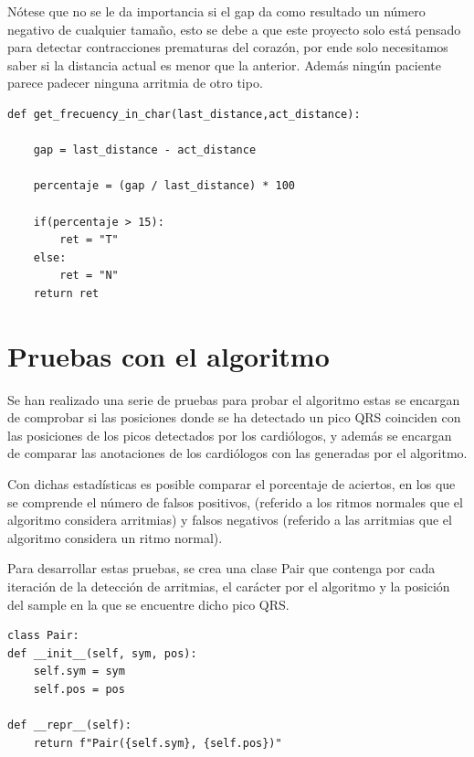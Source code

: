 Nótese que no se le da importancia si el gap da como resultado un número negativo de cualquier tamaño, esto se debe
a que este proyecto solo está pensado para detectar contracciones prematuras del corazón, por ende solo necesitamos 
saber si la distancia actual es menor que la anterior. Además ningún paciente parece padecer ninguna arritmia de otro
tipo.

\lstset{language=python, breaklines=true, basicstyle=\footnotesize}
\begin{lstlisting}[frame=single]
def get_frecuency_in_char(last_distance,act_distance): 

    gap = last_distance - act_distance

    percentaje = (gap / last_distance) * 100

    if(percentaje > 15):
        ret = "T"
    else:
        ret = "N"
    return ret

\end{lstlisting}

\section{Pruebas con el algoritmo}

Se han realizado una serie de pruebas para probar el algoritmo estas se encargan de comprobar si las posiciones donde
se ha detectado un pico QRS coinciden con las posiciones de los picos detectados por los cardiólogos, y además se 
encargan de comparar las anotaciones de los cardiólogos con las generadas por el algoritmo.

Con dichas estadísticas es posible comparar el porcentaje de aciertos, en los que se comprende el número de 
falsos positivos, (referido a los ritmos normales que el algoritmo considera arritmias) y 
falsos negativos (referido a las arritmias que el algoritmo considera un ritmo normal).

Para desarrollar estas pruebas, se crea una clase Pair que contenga por cada iteración de la detección de arritmias, el carácter 
por el algoritmo y la posición del sample en la que se encuentre dicho pico QRS.

\lstset{language=python, breaklines=true, basicstyle=\footnotesize}
\begin{lstlisting}[frame=single]
class Pair:
def __init__(self, sym, pos):
    self.sym = sym
    self.pos = pos

def __repr__(self):
    return f"Pair({self.sym}, {self.pos})"

\end{lstlisting}

